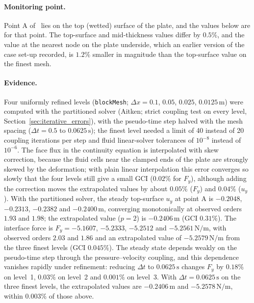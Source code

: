 \paragraph{Monitoring point.}
Point A of~\citet{Tukovic2018} lies on the top (wetted) surface of the plate, and the values below are for that point. The top-surface and mid-thickness values differ by $0.5\%$, and the value at the nearest node on the plate underside, which an earlier version of the case set-up recorded, is $1.2\%$ smaller in magnitude than the top-surface value on the finest mesh.

\paragraph{Evidence.}
Four uniformly refined levels (\texttt{blockMesh}; $\Delta x = 0.1$, $0.05$, $0.025$, $0.0125\,\mathrm{m}$) were computed with the partitioned solver (Aitken; strict coupling test on every level, Section~\ref{sec:iterative_errors}), with the pseudo-time step halved with the mesh spacing ($\Delta t = 0.5$ to $0.0625\,\mathrm{s}$); the finest level needed a limit of 40 instead of 20 coupling iterations per step and fluid linear-solver tolerances of $10^{-8}$ instead of $10^{-6}$.
The face flux in the continuity equation is interpolated with skew correction, because the fluid cells near the clamped ends of the plate are strongly skewed by the deformation; with plain linear interpolation this error converges so slowly that the four levels still give a small GCI ($0.02\%$ for $F_y$), although adding the correction moves the extrapolated values by about $0.05\%$ ($F_y$) and $0.04\%$ ($u_y$).
With the partitioned solver, the steady top-surface $u_y$ at point A is $-0.2048$, $-0.2313$, $-0.2382$ and $-0.2400\,\mathrm{m}$, converging monotonically at observed orders $1.93$ and $1.98$; the extrapolated value ($p = 2$) is $-0.2406\,\mathrm{m}$ (GCI $0.31\%$). The interface force is $F_y = -5.1607$, $-5.2333$, $-5.2512$ and $-5.2561\,\mathrm{N/m}$, with observed orders $2.03$ and $1.86$ and an extrapolated value of $-5.2579\,\mathrm{N/m}$ from the three finest levels (GCI $0.045\%$).
The steady state depends weakly on the pseudo-time step through the pressure--velocity coupling, and this dependence vanishes rapidly under refinement: reducing $\Delta t$ to $0.0625\,\mathrm{s}$ changes $F_y$ by $0.18\%$ on level~1, $0.03\%$ on level~2 and $0.001\%$ on level~3. With $\Delta t = 0.0625\,\mathrm{s}$ on the three finest levels, the extrapolated values are $-0.2406\,\mathrm{m}$ and $-5.2578\,\mathrm{N/m}$, within $0.003\%$ of those above.

